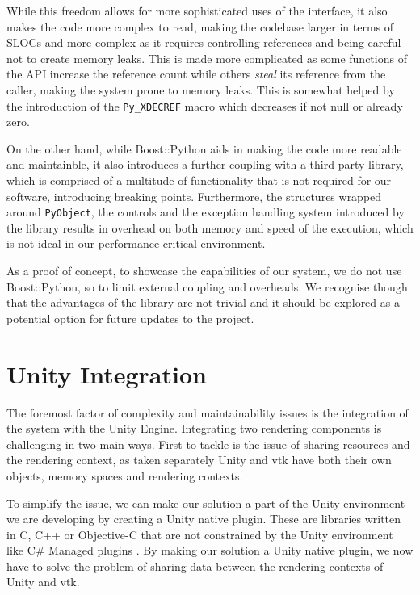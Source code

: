 While this freedom allows for more sophisticated uses of the interface, it also makes the code more complex to read, making the codebase larger in terms of SLOCs and more complex as it requires controlling references and being careful not to create memory leaks. This is made more complicated as some functions of the API increase the reference count while others \textit{steal} its reference from the caller, making the system prone to memory leaks. This is somewhat helped by the introduction of the \verb|Py_XDECREF| macro which decreases if not null or already zero.

On the other hand, while Boost::Python aids in making the code more readable and maintainble, it also introduces a further coupling with a third party library, which is comprised of a multitude of functionality that is not required for our software, introducing breaking points. Furthermore, the structures wrapped around \verb|PyObject|, the controls and the exception handling system introduced by the library results in overhead on both memory and speed of the execution, which is not ideal in our performance-critical environment. 

As a proof of concept, to showcase the capabilities of our system, we do not use Boost::Python, so to limit external coupling and overheads. We recognise though that the advantages of the library are not trivial and it should be explored as a potential option for future updates to the project.

\section{Unity Integration}

The foremost factor of complexity and maintainability issues is the integration of the system with the Unity Engine. Integrating two rendering components is challenging in two main ways. First to tackle is the issue of sharing resources and the rendering context, as taken separately Unity and \acrshort{vtk} have both their own objects, memory spaces and rendering contexts.

To simplify the issue, we can make our solution a part of the Unity environment we are developing by creating a Unity native plugin. These are libraries written in C, C++ or Objective-C that are not constrained by the Unity environment like C\# Managed plugins \cite{technologies_21AD}. By making our solution a Unity native plugin, we now have to solve the problem of sharing data between the rendering contexts of Unity and \acrshort{vtk}.

